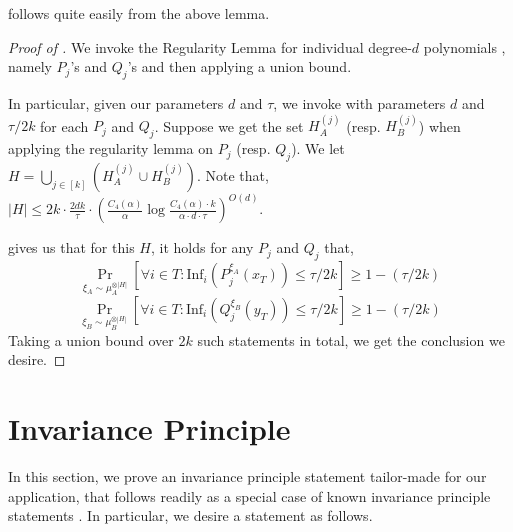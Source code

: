 \documentclass[11pt]{article}
\newcommand{\inparen}[1]{\left ( #1 \right )}
\newcommand{\insquare}[1]{\left [ #1 \right ]}
\newcommand{\Inf}{\mathrm{Inf}}
\begin{document}
\noindent {} follows quite easily from the above lemma.

\begin{proof}[Proof of ]
	We invoke the Regularity Lemma for individual degree-$d$ polynomials , namely $P_{j}$'s and $Q_{j}$'s and then applying a union bound.
	
	In particular, given our parameters $d$ and $\tau$, we invoke  with parameters $d$ and $\tau/2k$ for each $P_{j}$ and $Q_{j}$. Suppose we get the set $H_A^{(j)}$ (resp. $H_B^{(j)}$) when applying the regularity lemma on $P_{j}$ (resp. $Q_{j}$). We let $H = \bigcup_{j \in [k]} \inparen{H_A^{(j)} \cup H_B^{(j)}}$. Note that, $|H| \le 2k \cdot \frac{2dk}{\tau} \cdot \inparen{\frac{C_4(\alpha)}{\alpha} \log \frac{C_4(\alpha) \cdot k}{\alpha \cdot d \cdot \tau}}^{O(d)}$.
	
	 gives us that for this $H$, it holds for any $P_{j}$ and $Q_{j}$ that,
	\[ \Pr\limits_{\xi_A \sim \mu_A^{\otimes |H|}} \insquare{\forall i \in T : \Inf_i\inparen{P_{j}^{\xi_A}(x_T)} \le \tau/2k} \ge 1-(\tau/2k) \]
	\[ \Pr\limits_{\xi_B \sim \mu_B^{\otimes |H|}} \insquare{\forall i \in T : \Inf_i\inparen{Q_{j}^{\xi_B}(y_T)} \le \tau/2k} \ge 1-(\tau/2k) \]
	Taking a union bound over $2k$ such statements in total, we get the conclusion we desire.
	
\end{proof}%

\section{Invariance Principle} \label{sec:invariance}

In this section, we prove an invariance principle statement tailor-made for our application, that follows readily as a special case of known invariance principle statements \cite{mossel2005noise, mossel2010gaussianbounds, isaksson2012maximally}. In particular, we desire a statement as follows.
\end{document}
